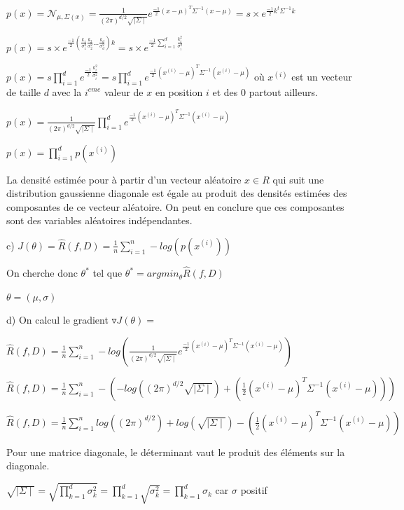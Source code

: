 \documentclass[a4paper,10pt]{article}
\begin{document}
$p(x) = \mathcal{N}_{\mu , \Sigma(x)} = \frac{1}{(2 \pi)^{d/2} \sqrt{\mid{\Sigma} \mid}} e^{\frac{-1}{2} (x- \mu)^{T} \Sigma^{-1} (x- \mu) } = s \times e^{\frac{-1}{2} k^{t} \Sigma^{-1} k }$

$p(x) = s \times e^{\frac{-1}{2} (\frac{k_{1}}{\sigma_{1}^{2}} \frac{k_{2}}{\sigma_{2}^{2}} ... \frac{k_{d}}{\sigma_{d}^{2}} )k }  = s \times e^{\frac{-1}{2} \sum_{i=1}^{d} \frac{k_{i}^{2} }{\sigma_{i}^{2}} }$

$p(x) = s \prod_{i=1}^{d} e^{\frac{-1}{2} \frac{k_{i}^{2} }{\sigma_{i}^{2}} }  = s \prod_{i=1}^{d} e^{\frac{-1}{2} (x^{(i)} - \mu)^{T} \Sigma^{-1} (x^{(i)} - \mu) } $ où $x^{(i)}$ est un vecteur de taille $d$ avec la $i^{eme}$ valeur de $x$ en position $i$ et des 0 partout ailleurs.

$p(x) =\frac{1}{(2 \pi)^{d/2} \sqrt{\mid{\Sigma} \mid}} \prod_{i=1}^{d} e^{\frac{-1}{2} (x^{(i)} - \mu)^{T} \Sigma^{-1} (x^{(i)} - \mu) }  $

$p(x) = \prod_{i=1}^{d} p(x^{(i)}) $


La densité estimée pour à partir d'un vecteur aléatoire $x \in R$ qui suit une distribution gaussienne diagonale est égale au produit des densités estimées des composantes de ce vecteur aléatoire. On peut en conclure que ces composantes sont des variables aléatoires indépendantes.


c) $ J(\theta) =\widehat{R}(f,D) = \frac{1}{n} \sum_{i=1}^{n} -log (p(x^{(i)}))$

On cherche donc $\theta^{*}$ tel que $\theta^{*} = argmin_{\theta} \widehat{R}(f,D)$

$ \theta = ( \mu, \sigma )$

d) On calcul le gradient $ \triangledown J(\theta) = $

$\widehat{R}(f,D) = \frac{1}{n} \sum_{i=1}^{n} -log (\frac{1}{(2 \pi)^{d/2} \sqrt{\mid{\Sigma} \mid}} e^{\frac{-1}{2} (x^{(i)}- \mu)^{T} \Sigma^{-1} (x^{(i)}- \mu) })$

$ \widehat{R}(f,D) = \frac{1}{n} \sum_{i=1}^{n} - ( -log((2 \pi)^{d/2} \sqrt{\mid{\Sigma} \mid} ) + (\frac{1}{2} (x^{(i)}- \mu)^{T} \Sigma^{-1} (x^{(i)}- \mu) ) )$

$ \widehat{R}(f,D) = \frac{1}{n} \sum_{i=1}^{n} log((2 \pi)^{d/2} )+log(\sqrt{\mid{\Sigma} \mid} ) - (\frac{1}{2} (x^{(i)}- \mu)^{T} \Sigma^{-1} (x^{(i)}- \mu) ) $

Pour une matrice diagonale, le déterminant vaut le produit des éléments sur la diagonale.

$\sqrt{\mid{\Sigma} \mid} = \sqrt{ \prod_{k=1}^{d} \sigma^{2}_{k} } =   \prod_{k=1}^{d} \sqrt{\sigma^{2}_{k} } = \prod_{k=1}^{d} \sigma_{k} $ car $\sigma$ positif
\end{document}

